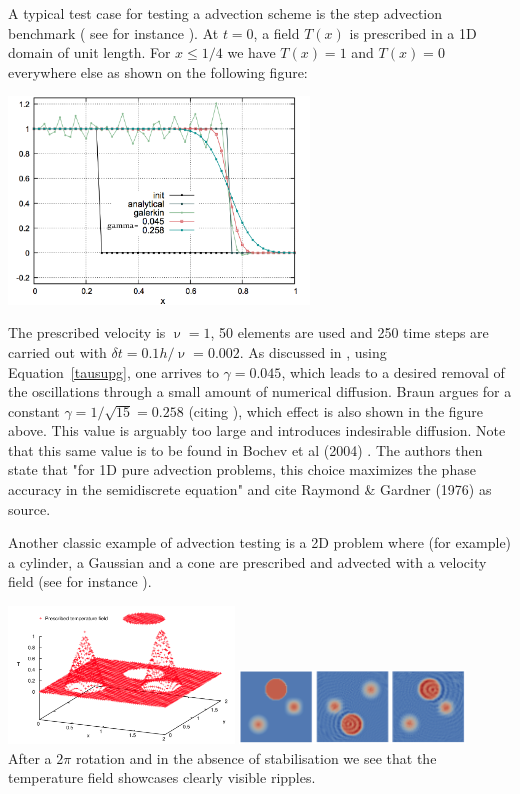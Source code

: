 A typical test case for testing a advection scheme is the step advection benchmark (
see for instance \cite{dohu03}). At $t=0$, 
a field $T(x)$ is prescribed in a 1D domain of unit length. For $x\le 1/4$ we have $T(x)=1$ and 
$T(x)=0$ everywhere else as shown on the following figure:
\begin{center}
\includegraphics[width=8cm]{images/supg/fantom3}
\end{center}
The prescribed velocity is $\upnu=1$, 50 elements are used and 250 time steps are 
carried out with $\delta t=0.1h/\upnu=0.002$.
As discussed in \cite{thie11}, using Equation~\ref{tausupg}, 
one arrives to $\gamma=0.045$, which leads to a desired removal of the oscillations through a small
amount of numerical diffusion. Braun \cite{brau03} argues for a constant
$\gamma=1/\sqrt{15}=0.258$ (citing \cite{hubr82}), which effect is also shown in the figure above. This 
value is arguably too large and introduces indesirable diffusion. Note that this same value is 
to be found in Bochev et al (2004) \cite{bogs04}. The authors then state that 
"for 1D pure advection problems, this choice maximizes the phase accuracy in the semidiscrete
equation" and cite Raymond \& Gardner (1976) \cite{raga76} as source. 

Another classic example of advection testing is a 2D problem where (for example) a cylinder, a Gaussian 
and a cone are prescribed and advected with a velocity field (see for instance \cite{dohu03}). 

\begin{center}
\includegraphics[width=0.45\textwidth]{images/supg/supg1}
\includegraphics[width=0.45\textwidth]{images/supg/supg2}\\
{\captionfont After a $2\pi$ rotation and in the absence of stabilisation we see that the temperature field
showcases clearly visible ripples.}
\end{center}

